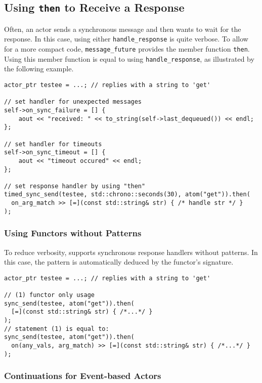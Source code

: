 \clearpage
\subsection{Using \lstinline^then^ to Receive a Response}

Often, an actor sends a synchronous message and then wants to wait for the response.
In this case, using either \lstinline^handle_response^ is quite verbose.
To allow for a more compact code, \lstinline^message_future^ provides the member function \lstinline^then^.
Using this member function is equal to using \lstinline^handle_response^, as illustrated by the following example.

\begin{lstlisting}
actor_ptr testee = ...; // replies with a string to 'get'

// set handler for unexpected messages
self->on_sync_failure = [] {
    aout << "received: " << to_string(self->last_dequeued()) << endl;
};

// set handler for timeouts
self->on_sync_timeout = [] {
    aout << "timeout occured" << endl;
};

// set response handler by using "then"
timed_sync_send(testee, std::chrono::seconds(30), atom("get")).then(
  on_arg_match >> [=](const std::string& str) { /* handle str */ }
);
\end{lstlisting}

\subsubsection{Using Functors without Patterns}

To reduce verbosity, \libcppa supports synchronous response handlers without patterns.
In this case, the pattern is automatically deduced by the functor's signature.

\begin{lstlisting}
actor_ptr testee = ...; // replies with a string to 'get'

// (1) functor only usage
sync_send(testee, atom("get")).then(
  [=](const std::string& str) { /*...*/ }
);
// statement (1) is equal to:
sync_send(testee, atom("get")).then(
  on(any_vals, arg_match) >> [=](const std::string& str) { /*...*/ }
);
\end{lstlisting}

\clearpage
\subsubsection{Continuations for Event-based Actors}

